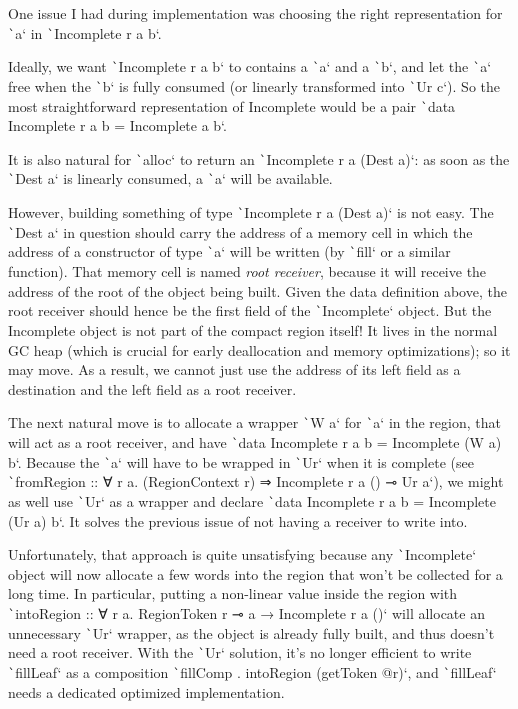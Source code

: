 \documentclass[english]{jflart}
\begin{document}
One issue I had during implementation was choosing the right representation for \texttt`a` in \texttt`Incomplete r a b`.

Ideally, we want \texttt`Incomplete r a b` to contains a \texttt`a` and a \texttt`b`, and let the \texttt`a` free when the \texttt`b` is fully consumed (or linearly transformed into \texttt`Ur c`). So the most straightforward representation of Incomplete would be a pair \texttt`data Incomplete r a b = Incomplete a b`.

It is also natural for \texttt`alloc` to return an \texttt`Incomplete r a (Dest a)`: as soon as the \texttt`Dest a` is linearly consumed, a \texttt`a` will be available.

However, building something of type \texttt`Incomplete r a (Dest a)` is not easy. The \texttt`Dest a` in question should carry the address of a memory cell in which the address of a constructor of type \texttt`a` will be written (by \texttt`fill` or a similar function). That memory cell is named \emph{root receiver}, because it will receive the address of the root of the object being built. Given the data definition above, the root receiver should hence be the first field of the \texttt`Incomplete` object. But the Incomplete object is not part of the compact region itself! It lives in the normal GC heap (which is crucial for early deallocation and memory optimizations); so it may move. As a result, we cannot just use the address of its left field as a destination and the left field as a root receiver.

The next natural move is to allocate a wrapper \texttt`W a` for \texttt`a` in the region, that will act as a root receiver, and have \texttt`data Incomplete r a b = Incomplete (W a) b`. Because the \texttt`a` will have to be wrapped in \texttt`Ur` when it is complete (see \texttt`fromRegion :: ∀ r a. (RegionContext r) ⇒ Incomplete r a () ⊸ Ur a`), we might as well use \texttt`Ur` as a wrapper and declare \texttt`data Incomplete r a b = Incomplete (Ur a) b`. It solves the previous issue of not having a receiver to write into.

Unfortunately, that approach is quite unsatisfying because any \texttt`Incomplete` object will now allocate a few words into the region that won't be collected for a long time. In particular, putting a non-linear value inside the region with \texttt`intoRegion :: ∀ r a. RegionToken r ⊸ a → Incomplete r a ()` will allocate an unnecessary \texttt`Ur` wrapper, as the object is already fully built, and thus doesn't need a root receiver. With the \texttt`Ur` solution, it's no longer efficient to write \texttt`fillLeaf` as a composition \texttt`fillComp . intoRegion (getToken @r)`, and \texttt`fillLeaf` needs a dedicated optimized implementation.
\end{document}
